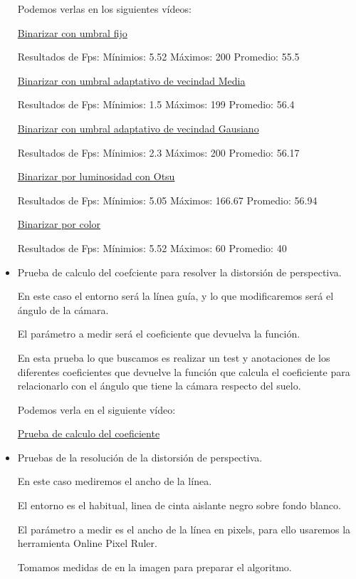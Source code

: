 \begin{itemize}
	
	Podemos verlas en los siguientes vídeos:
	
	\href{https://youtu.be/Gu_HvPr3cCU}{Binarizar con umbral fijo}
	
	Resultados de Fps: Mínimios: 5.52 Máximos: 200 Promedio: 55.5
	
	\href{https://youtu.be/NCWQ2I-1J_o}{Binarizar con umbral adaptativo de vecindad Media}
	
	Resultados de Fps: Mínimios: 1.5 Máximos: 199 Promedio: 56.4
	
	\href{https://youtu.be/XPxqk3kNXKY}{Binarizar con umbral adaptativo de vecindad Gausiano}
	
	Resultados de Fps: Mínimios: 2.3 Máximos: 200 Promedio: 56.17
	
	\href{https://youtu.be/4CW4r9qdo4Y}{Binarizar por luminosidad con Otsu}
	
	Resultados de Fps: Mínimios: 5.05 Máximos: 166.67 Promedio: 56.94
	
	\href{https://youtu.be/Rks5PkxDeZQ}{Binarizar por color}
	
	Resultados de Fps: Mínimios: 5.52 Máximos: 60 Promedio: 40
	
	\item Prueba de calculo del coefciente para resolver la distorsión de perspectiva. 
	
	En este caso el entorno será la línea guía, y lo que modificaremos será el ángulo de la cámara.
	
El parámetro a medir será el coeficiente que devuelva la función.

En esta prueba lo que buscamos es realizar un test y anotaciones de los diferentes coeficientes que devuelve la función que calcula el coeficiente para relacionarlo con el ángulo que tiene la cámara respecto del suelo.
	
	Podemos verla en el siguiente vídeo: 
	
	\href{https://youtu.be/Y9QgFIMXSiU}{Prueba de calculo del coeficiente}
	
	
	\item Pruebas de la resolución de la distorsión de perspectiva. 
	
	En este caso mediremos el ancho de la línea.
	
El entorno es el habitual, linea de cinta aislante negro sobre fondo blanco.

El parámetro a medir es el ancho de la línea en pixels, para ello
usaremos la herramienta Online Pixel Ruler.

Tomamos medidas de en la imagen para preparar el algoritmo.


\end{itemize}
